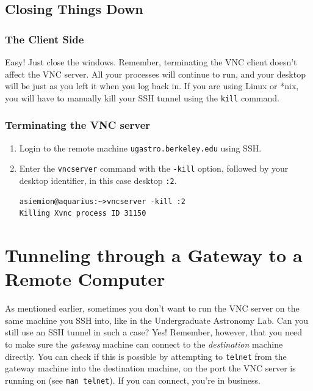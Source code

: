 \documentclass[11pt,preprint]{aastex}
\begin{document}
\subsection{Closing Things Down}
\subsubsection{The Client Side}
Easy! Just close the windows.  Remember, terminating the VNC client doesn't affect the VNC server.  All your processes will continue to run, and your desktop will be just
as you left it when you log back in.  If you are using Linux or *nix, you will have to manually kill your SSH tunnel using the \verb$kill$ command.

\subsubsection{Terminating the VNC server}
\begin{enumerate}

\item Login to the remote machine \verb$ugastro.berkeley.edu$ using SSH.

\item Enter the \verb$vncserver$ command with the \verb$-kill$ option, followed by your desktop identifier, in this case desktop \verb$:2$.

\begin{verbatim}
asiemion@aquarius:~>vncserver -kill :2
Killing Xvnc process ID 31150
\end{verbatim}

\end{enumerate}

\section{Tunneling through a Gateway to a Remote Computer}

As mentioned earlier, sometimes you don't want to run the VNC server on the same machine you SSH into, like in the Undergraduate Astronomy Lab.  Can you still use an SSH tunnel in such a case?  Yes!  Remember, however, that you need to make sure the \emph{gateway} machine can connect to the \emph{destination} machine directly.  You can check if this is possible
by attempting to \verb$telnet$ from the gateway machine into the destination machine, on the port the VNC server is running on (see \verb$man telnet$).  If you can connect, you're in business.
\\
\end{document}
